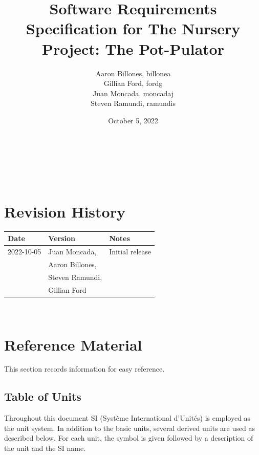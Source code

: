 \documentclass[12pt]{article}
\begin{document}
\title{Software Requirements Specification for The Nursery Project: The Pot-Pulator} 
\author{Aaron Billones, billonea\\Gillian Ford, fordg\\Juan Moncada, moncadaj\\Steven Ramundi, ramundis}
\date{October 5, 2022}
	
\maketitle

~\newpage


\tableofcontents

~\newpage

\section*{Revision History}

\begin{tabularx}{\textwidth}{p{3cm}p{4cm}X}
\toprule {\bf Date} & {\bf Version} & {\bf Notes}\\
\midrule
2022-10-05 & Juan Moncada,& Initial release\\&Aaron Billones,\\&Steven Ramundi,\\&Gillian Ford \\

\bottomrule
\end{tabularx}

~\newpage

\section{Reference Material}

This section records information for easy reference.

\subsection{Table of Units}

Throughout this document SI (Syst\`{e}me International d'Unit\'{e}s) is employed
as the unit system.  In addition to the basic units, several derived units are
used as described below.  For each unit, the symbol is given followed by a
description of the unit and the SI name.
~\newline
\end{document}
